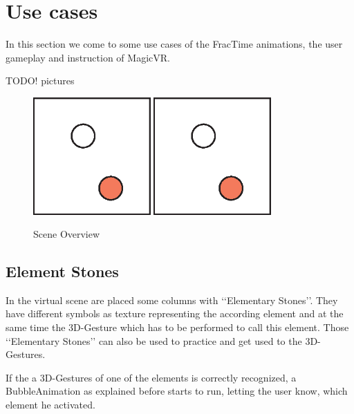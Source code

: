 \section{Use cases}
In this section we come to some use cases of the FracTime animations, the user gameplay and instruction of MagicVR.

TODO! pictures\\
\begin{figure}[!ht]
\includegraphics[width=0.4\textwidth]{pictures/sample.eps}
\includegraphics[width=0.4\textwidth]{pictures/sample.eps}
\caption{Scene Overview}
\end{figure}

\subsection{Element Stones}
In the virtual scene are placed some columns with \lq\lq{}Elementary Stones\rq\rq{}. They have different symbols as texture representing the according element and at the same time the 3D-Gesture which has to be performed to call this element. Those \lq\lq{}Elementary Stones\rq\rq{} can also be used to practice and get used to the 3D-Gestures.

If the a 3D-Gestures of one of the elements is correctly recognized, a BubbleAnimation as explained before starts to run, letting the user know, which element he activated.

